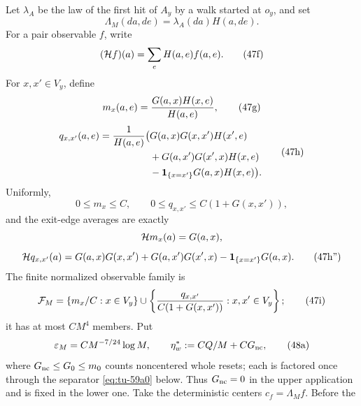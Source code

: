 Let \(\lambda_A\) be the law of the first hit of \(A_y\) by a walk started
at \(o_y\), and set
\begin{equation}
                 \Lambda_M(da,de)=\lambda_A(da)H(a,de).     \tag{47e}\label{eq:tu-47e}
\end{equation}
For a pair observable \(f\), write
\begin{equation}
                 ({\cal H}f)(a)=\sum_eH(a,e)f(a,e).         \tag{47f}\label{eq:tu-47f}
\end{equation}
For \(x,x'\in V_y\), define
\begin{equation}
 m_x(a,e)={G(a,x)H(x,e)\over H(a,e)},                       \tag{47g}\label{eq:tu-47g}
\end{equation}
\begin{equation}
\begin{aligned}
q_{x,x'}(a,e)=\frac{1}{H(a,e)}\big(&G(a,x)G(x,x')H(x',e)\\
&+G(a,x')G(x',x)H(x,e)\\
&-{\bf1}_{\{x=x'\}}G(a,x)H(x,e)\big).
\end{aligned}                                             \tag{47h}\label{eq:tu-47h}
\end{equation}
Uniformly,
\begin{equation}
 0\le m_x\le C,\qquad0\le q_{x,x'}\le C(1+G(x,x')),       \tag{47h'}\label{eq:tu-47h-prime}
\end{equation}
and the exit-edge averages are exactly
\[
 {\cal H}m_x(a)=G(a,x),
\]
\begin{equation}
 {\cal H}q_{x,x'}(a)=G(a,x)G(x,x')+G(a,x')G(x',x)
             -{\bf1}_{\{x=x'\}}G(a,x).                    \tag{47h''}\label{eq:tu-47h-doubleprime}
\end{equation}
The finite normalized observable family is
\begin{equation}
 {\cal F}_M=\{m_x/C:x\in V_y\}\cup
 \left\{{q_{x,x'}\over C(1+G(x,x'))}:x,x'\in V_y\right\}; \tag{47i}\label{eq:tu-47i}
\end{equation}
it has at most \(CM^4\) members.  Put
\begin{equation}
 \varepsilon_M=CM^{-7/24}\log M,
 \qquad
 \eta_w^*:=CQ/M+CG_{\rm nc},                                \tag{48a}\label{eq:tu-48a}
\end{equation}
where \(G_{\rm nc}\le G_0\le m_0\) counts noncentered whole resets; each
is factored once through the separator \eqref{eq:tu-59a0} below.  Thus
\(G_{\rm nc}=0\) in the upper application and is fixed in the lower one.
Take the deterministic centers \(c_f=\Lambda_Mf\).  Before the
